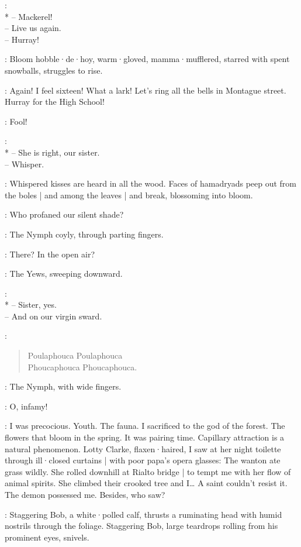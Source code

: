 \HalcyonDays:
\\*
-- Mackerel!\\
-- Live us again.\\
-- Hurray!\\

:
Bloom hobble·de·hoy,
warm·gloved,
mamma·mufflered,
starred with spent snowballs,
struggles to rise.

\Bloom:
Again!
I feel sixteen!
What a lark!
Let's ring all the bells in Montague street.
Hurray for the High School!

\Echo:
Fool!

\Yews:
\\*
-- She is right, our sister.\\
-- Whisper.%

:
Whispered kisses are heard in all the wood.
Faces of hamadryads peep out from the boles |
and among the leaves |
and break,
blossoming into bloom.

\Yews:
Who profaned our silent shade?

:
The Nymph coyly,
through parting fingers.

\Nymph:
There?
In the open air?

:
The Yews,
sweeping downward.

\Yews:\\*
-- Sister, yes.\\
-- And on our virgin sward.

\Waterfall:
\begin{verse}
    Poulaphouca Poulaphouca\\
    Phoucaphouca Phoucaphouca.
\end{verse}

:
The Nymph,
with wide fingers.

\Nymph:
O,
infamy!

\Bloom:
I was precocious.
Youth.
The fauna.
I sacrificed to the god of the forest.
The flowers that bloom in the spring.
It was pairing time.
Capillary attraction is a natural phenomenon.
Lotty Clarke,
flaxen·haired,
I saw at her night toilette through ill·closed curtains |
with poor papa's opera glasses:
The wanton ate grass wildly.
She rolled downhill at Rialto bridge |
to tempt me with her flow of animal spirits.
She climbed their crooked tree and I…
A saint couldn't resist it.
The demon possessed me.
Besides,
who saw?

:
Staggering Bob,
a white·polled calf,
%
thrusts a ruminating head with humid nostrils through the foliage.
Staggering Bob,
large teardrops rolling from his prominent eyes,
snivels.


